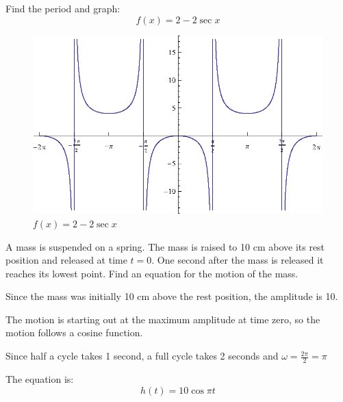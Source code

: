 \documentclass[fleqn,addpoints]{exam}
\begin{document}
\begin{questions}
\begin{solution}
      \end{solution}

    \question[10]
    Find the period and graph:
      \[
        f(x) = 2 - 2 \sec x
      \]

      \begin{solution}
        \begin{figure}[H]
          \centering
          \includegraphics[scale=1.0]{graph3.eps}
          \caption{$f(x) = 2 - 2 \sec x $}
        \end{figure}

      \end{solution}

    \question[8]
      A mass is suspended on a spring.  The mass is raised to 10 cm above its rest position and released at time $t =
      0$.  One second after the mass is released it reaches its lowest point.  Find an equation for the motion of the mass.
      
      \begin{solution}
        \begin{itemize*}
          \item Since the mass was initially 10 cm above the rest position, the amplitude is 10.
          \item The motion is starting out at the maximum amplitude at time zero, so the motion follows a cosine
            function.
          \item Since half a cycle takes 1 second, a full cycle takes 2 seconds and $\omega = \frac{2 \pi}{2} = \pi$ 
        \end{itemize*}

        The equation is:
        \[
          h(t) = 10 \cos \pi t
        \]


\end{solution}
\end{questions}
\end{document}
